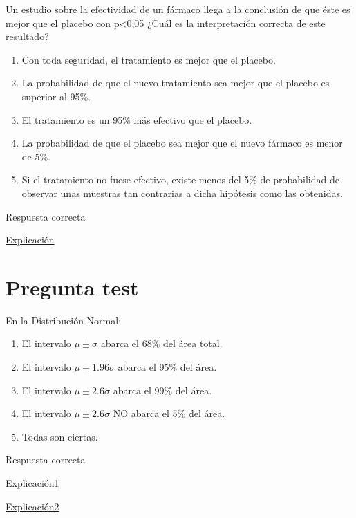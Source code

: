 \documentclass[
]{book}
\providecommand{\tightlist}{%
  \setlength{\itemsep}{0pt}\setlength{\parskip}{0pt}}
\begin{document}
Un estudio sobre la efectividad de un fármaco llega a la conclusión de que éste es mejor que el placebo con p\textless0,05 ¿Cuál es la interpretación correcta de este resultado?

\begin{enumerate}
\def\labelenumi{\alph{enumi})}
\tightlist
\item
  Con toda seguridad, el tratamiento es mejor que el placebo.
\item
  La probabilidad de que el nuevo tratamiento sea mejor que el placebo es superior al 95\%.
\item
  El tratamiento es un 95\% más efectivo que el placebo.
\item
  La probabilidad de que el placebo sea mejor que el nuevo fármaco es menor de 5\%.
\item
  Si el tratamiento no fuese efectivo, existe menos del 5\% de probabilidad de observar unas muestras tan contrarias a dicha hipótesis como las obtenidas.
\end{enumerate}

Respuesta correcta

\href{https://1fjmanzano.github.io/bioestadistica/valor-p.html}{Explicación}

\hypertarget{pregunta-test-96}{%
\section{Pregunta test}\label{pregunta-test-96}}

En la Distribución Normal:

\begin{enumerate}
\def\labelenumi{\alph{enumi})}
\tightlist
\item
  El intervalo \(\mu \pm \sigma\) abarca el 68\% del área total.
\item
  El intervalo \(\mu \pm 1.96 \sigma\) abarca el 95\% del área.
\item
  El intervalo \(\mu \pm 2.6\sigma\) abarca el 99\% del área.
\item
  El intervalo \(\mu \pm 2.6\sigma\) NO abarca el 5\% del área.
\item
  Todas son ciertas.
\end{enumerate}

Respuesta correcta

\href{https://1fjmanzano.github.io/bioestadistica/distribuciones-de-probabilidad.html\#distribucio\%CC\%81n-normal}{Explicación1}

\href{https://youtu.be/wWeogWp_bO8}{Explicación2}
\end{document}
